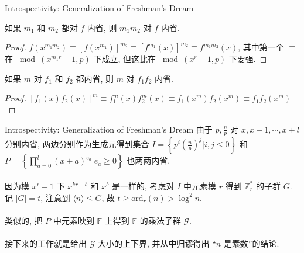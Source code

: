 \documentclass{beamer}
\def\le{\leqslant}
\def\ge{\geqslant}
\def\ord{\textrm{ord}}
\begin{document}
\begin{frame}{Introspectivity: Generalization of Freshman's Dream}
	
	\begin{lemma}[数乘封闭性]
		如果 $m_1$ 和 $m_2$ 都对 $f$ 内省, 则 $m_1m_2$ 对 $f$ 内省.
	\end{lemma}
	\begin{proof}
		$f(x^{m_1m_2}) \equiv [f(x^{m_1})]^{m_2} \equiv [f^{m_1}(x)]^{m_2} \equiv f^{m_1m_2}(x)$, 其中第一个 $\equiv$ 在 $\bmod (x^{m_1r} - 1, p)$ 下成立, 但这比在 $\bmod (x^{r} - 1, p)$ 下要强.
	\end{proof}
	\pause
	\begin{lemma}[多项式乘封闭性]
		如果 $m$ 对 $f_1$ 和 $f_2$ 都内省, 则 $m$ 对 $f_1f_2$ 内省.
	\end{lemma}
	\begin{proof}
		$[f_1(x)f_2(x)]^m \equiv f_1^m(x)f_2^m(x) \equiv f_1(x^m)f_2(x^m) \equiv f_1f_2(x^m)$
	\end{proof}
\end{frame}
\begin{frame}{Introspectivity: Generalization of Freshman's Dream}
	由于 $p, \frac np$ 对 $x, x + 1, \cdots, x + l$ 分别内省, 两边分别作为生成元得到集合 $I = \left\{p^i \left(\frac np\right)^j \bigg| i, j \le 0\right\}$ 和 $P = \left\{\prod\limits_{a=0}^{l}(x + a)^{e_a} \bigg| e_a \ge 0\right\}$ 也两两内省. \\~\\

	因为模 $x^r - 1$ 下 $x^{kr + b}$ 和 $x^b$ 是一样的, 考虑对 $I$ 中元素模 $r$ 得到 $\mathbb Z_r^*$ 的子群 $G$. 记 $|G| = t$, 注意到 $\langle n \rangle \le G$, 故 $t \ge \ord_r(n) > \log^2n$.\\~\\

	类似的, 把 $P$ 中元素映到 $\mathbb F$ 上得到 $\mathbb F$ 的乘法子群 $\mathcal G$. \\~\\

	接下来的工作就是给出 $\mathcal G$ 大小的上下界, 并从中归谬得出 “$n$ 是素数”的结论.
\end{frame}
\end{document}

